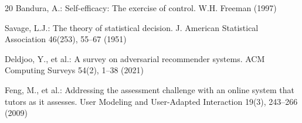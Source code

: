 \documentclass[runningheads]{llncs}
\begin{document}
\begin{thebibliography}{20}
Bandura, A.: Self-efficacy: The exercise of control. W.H. Freeman (1997)

Savage, L.J.: The theory of statistical decision. J. American Statistical Association 46(253), 55--67 (1951)

Deldjoo, Y., et al.: A survey on adversarial recommender systems. ACM Computing Surveys 54(2), 1--38 (2021)

Feng, M., et al.: Addressing the assessment challenge with an online system that tutors as it assesses. User Modeling and User-Adapted Interaction 19(3), 243--266 (2009)

\end{thebibliography}
\end{document}
